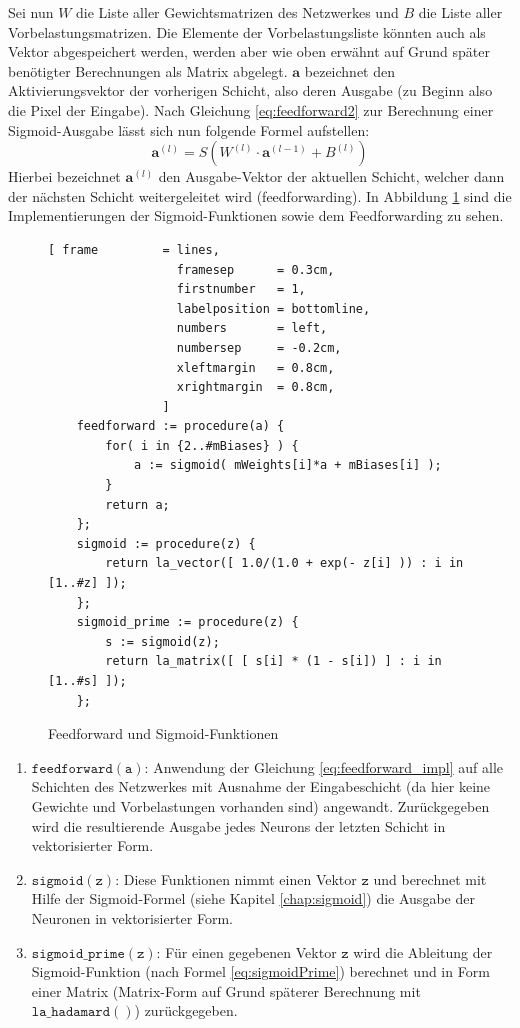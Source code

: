 \noindent
Sei nun $W$ die Liste aller Gewichtsmatrizen des Netzwerkes und $B$ die Liste aller Vorbelastungsmatrizen. Die Elemente der Vorbelastungsliste könnten auch als Vektor abgespeichert werden, werden aber wie oben erwähnt auf Grund später benötigter Berechnungen als Matrix abgelegt. $\mathbf{a}$ bezeichnet den Aktivierungsvektor der vorherigen Schicht, also deren Ausgabe (zu Beginn also die Pixel der Eingabe). Nach Gleichung \ref{eq:feedforward2} zur Berechnung einer Sigmoid-Ausgabe lässt sich nun folgende Formel aufstellen: 
\begin{equation}\label{eq:feedforward_impl}
	\mathbf{a}^{(l)} = S(W^{(l)}\cdot \mathbf{a}^{(l-1)} + B^{(l)})
\end{equation}
\noindent
Hierbei bezeichnet $\mathbf{a}^{(l)}$ den Ausgabe-Vektor der aktuellen Schicht, welcher dann der nächsten Schicht weitergeleitet wird (feedforwarding). In Abbildung \ref{fig:feedforward_sigmoid} sind die Implementierungen der Sigmoid-Funktionen sowie dem Feedforwarding zu sehen.
\begin{figure}
\begin{Verbatim}[ frame         = lines, 
                  framesep      = 0.3cm, 
                  firstnumber   = 1,
                  labelposition = bottomline,
                  numbers       = left,
                  numbersep     = -0.2cm,
                  xleftmargin   = 0.8cm,
                  xrightmargin  = 0.8cm,
                ]
    feedforward := procedure(a) {
        for( i in {2..#mBiases} ) { 
            a := sigmoid( mWeights[i]*a + mBiases[i] );
        }
        return a;
    };                            
    sigmoid := procedure(z) {
        return la_vector([ 1.0/(1.0 + exp(- z[i] )) : i in [1..#z] ]);
    };
    sigmoid_prime := procedure(z) {
        s := sigmoid(z); 
        return la_matrix([ [ s[i] * (1 - s[i]) ] : i in [1..#s] ]);
    };
\end{Verbatim}
\vspace*{-0.3cm}
\caption{Feedforward und Sigmoid-Funktionen}
\label{fig:feedforward_sigmoid}
\end{figure}
\begin{enumerate}
\item $\mathtt{feedforward(a)}$: Anwendung der Gleichung \eqref{eq:feedforward_impl} auf alle Schichten des Netzwerkes mit Ausnahme der Eingabeschicht (da hier keine Gewichte und Vorbelastungen vorhanden sind) angewandt. Zurückgegeben wird die resultierende Ausgabe jedes Neurons der letzten Schicht in vektorisierter Form.
\item $\mathtt{sigmoid(z)}$: Diese Funktionen nimmt einen Vektor $\mathtt{z}$ und berechnet mit Hilfe der Sigmoid-Formel (siehe Kapitel \ref{chap:sigmoid}) die Ausgabe der Neuronen in vektorisierter Form.
\item $\mathtt{sigmoid\_prime(z)}$: Für einen gegebenen Vektor $\mathtt{z}$ wird die Ableitung der Sigmoid-Funktion (nach Formel \eqref{eq:sigmoidPrime}) berechnet und in Form einer Matrix (Matrix-Form auf Grund späterer Berechnung mit $\mathtt{la\_hadamard()}$) zurückgegeben.
\end{enumerate}
